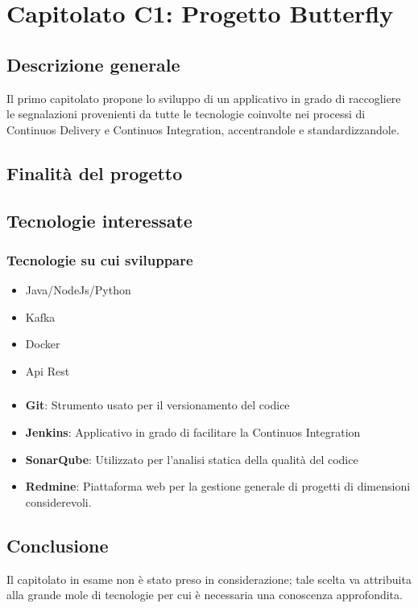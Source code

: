\chapter{Capitolato C1: Progetto Butterfly}
\section{Descrizione generale}
Il primo capitolato propone lo sviluppo di un applicativo in grado di 
raccogliere le segnalazioni provenienti da tutte le tecnologie coinvolte nei processi di Continuos Delivery e Continuos Integration, accentrandole e standardizzandole.

\section{Finalit\`a del progetto}

 


\section{Tecnologie interessate}
\subsection{Tecnologie su cui sviluppare}
\begin{itemize}
	\item Java/NodeJs/Python%
	\item Kafka%
	\item Docker%
	\item Api Rest%
\end{itemize}

\subsection{}
\begin{itemize}
	\item \textbf{Git}: Strumento usato per il versionamento del codice
	\item \textbf{Jenkins}: Applicativo in grado di facilitare la Continuos Integration
	\item \textbf{SonarQube}: Utilizzato per l'analisi statica della qualità del codice
	\item \textbf{Redmine}: Piattaforma web per la gestione generale di progetti di dimensioni considerevoli.
\end{itemize}


\section{Conclusione}
Il capitolato in esame non è stato preso in considerazione; tale scelta va attribuita alla grande mole di tecnologie per cui è necessaria una conoscenza approfondita.